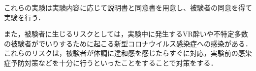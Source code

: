 \begin{small}
    これらの実験は実験内容に応じて説明書と同意書を用意し、被験者の同意を得て実験を行う．

    また，被験者に生じるリスクとしては，実験中に発生するVR酔いや不特定多数の被験者がでいりするために起こる新型コロナウイルス感染症への感染がある．これらのリスクは，被験者が体調に違和感を感じたらすぐに対応，実験前の感染症予防対策などを十分に行うといったことをすることで対策をする．
  
  
    
    





\end{small}

